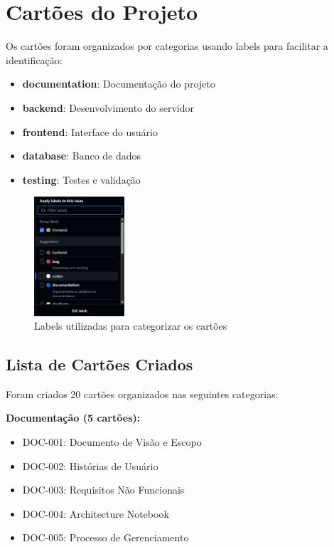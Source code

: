 \documentclass[12pt,a4paper]{article}
\begin{document}
\section{Cartões do Projeto}

Os cartões foram organizados por categorias usando labels para facilitar a identificação:

\begin{itemize}
    \item \textbf{documentation}: Documentação do projeto
    \item \textbf{backend}: Desenvolvimento do servidor
    \item \textbf{frontend}: Interface do usuário
    \item \textbf{database}: Banco de dados
    \item \textbf{testing}: Testes e validação
\end{itemize}

\begin{figure}[h]
    \centering
    \includegraphics[width=0.3\textwidth]{processo/labels_github.png}
    \caption{Labels utilizadas para categorizar os cartões}
    \label{fig:labels}
\end{figure}

\subsection{Lista de Cartões Criados}

Foram criados 20 cartões organizados nas seguintes categorias:

\textbf{Documentação (5 cartões):}
\begin{itemize}
    \item DOC-001: Documento de Visão e Escopo
    \item DOC-002: Histórias de Usuário
    \item DOC-003: Requisitos Não Funcionais
    \item DOC-004: Architecture Notebook
    \item DOC-005: Processo de Gerenciamento
\end{itemize}
\end{document}
